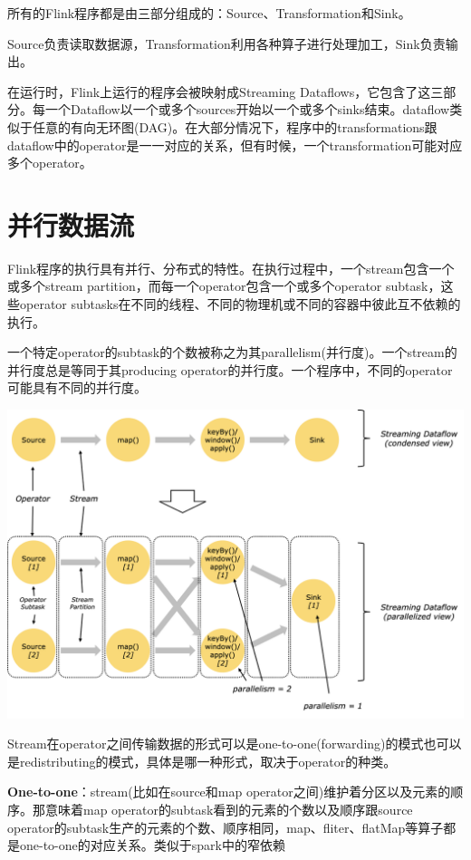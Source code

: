\documentclass[oneside]{ctexbook}
\begin{document}
所有的Flink程序都是由三部分组成的：Source、Transformation和Sink。

Source负责读取数据源，Transformation利用各种算子进行处理加工，Sink负责输出。

在运行时，Flink上运行的程序会被映射成Streaming Dataflows，它包含了这三部分。每一个Dataflow以一个或多个sources开始以一个或多个sinks结束。dataflow类似于任意的有向无环图(DAG)。在大部分情况下，程序中的transformations跟dataflow中的operator是一一对应的关系，但有时候，一个transformation可能对应多个operator。

\section{并行数据流}

Flink程序的执行具有并行、分布式的特性。在执行过程中，一个stream包含一个或多个stream partition，而每一个operator包含一个或多个operator subtask，这些operator subtasks在不同的线程、不同的物理机或不同的容器中彼此互不依赖的执行。

一个特定operator的subtask的个数被称之为其parallelism(并行度)。一个stream的并行度总是等同于其producing operator的并行度。一个程序中，不同的operator可能具有不同的并行度。

\noindent \includegraphics[width=\textwidth]{parallel_dataflow.png}

Stream在operator之间传输数据的形式可以是one-to-one(forwarding)的模式也可以是redistributing的模式，具体是哪一种形式，取决于operator的种类。

\textbf{One-to-one}：stream(比如在source和map operator之间)维护着分区以及元素的顺序。那意味着map operator的subtask看到的元素的个数以及顺序跟source operator的subtask生产的元素的个数、顺序相同，map、fliter、flatMap等算子都是one-to-one的对应关系。类似于spark中的窄依赖
\end{document}
